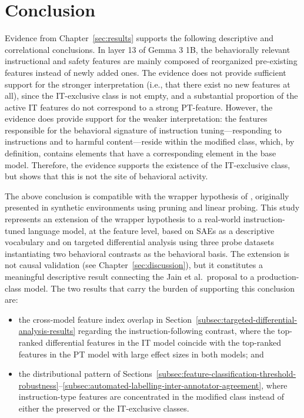 \pagestyle{fancy}

\section{Conclusion}
\label{sec:conclusions}

Evidence from Chapter~\ref{sec:results} supports the following descriptive and correlational conclusions. In layer 13 of Gemma 3 1B, the behaviorally relevant instructional and safety features are mainly composed of reorganized pre-existing features instead of newly added ones. The evidence does not provide sufficient support for the stronger interpretation (i.e., that there exist no new features at all), since the IT-exclusive class is not empty, and a substantial proportion of the active IT features do not correspond to a strong PT-feature. However, the evidence does provide support for the weaker interpretation: the features responsible for the behavioral signature of instruction tuning---responding to instructions and to harmful content---reside within the modified class, which, by definition, contains elements that have a corresponding element in the base model. Therefore, the evidence supports the existence of the IT-exclusive class, but shows that this is not the site of behavioral activity.

The above conclusion is compatible with the wrapper hypothesis of \textcite{jain_mechanistically_2024}, originally presented in synthetic environments using pruning and linear probing. This study represents an extension of the wrapper hypothesis to a real-world instruction-tuned language model, at the feature level, based on SAEs as a descriptive vocabulary and on targeted differential analysis using three probe datasets instantiating two behavioral contrasts as the behavioral basis. The extension is not causal validation (see Chapter~\ref{sec:discussion}), but it constitutes a meaningful descriptive result connecting the Jain et al.\ proposal to a production-class model. The two results that carry the burden of supporting this conclusion are:
\begin{itemize}
    \item the cross-model feature index overlap in Section~\ref{subsec:targeted-differential-analysis-results} regarding the instruction-following contrast, where the top-ranked differential features in the IT model coincide with the top-ranked features in the PT model with large effect sizes in both models; and
    \item the distributional pattern of Sections~\ref{subsec:feature-classification-threshold-robustness}--\ref{subsec:automated-labelling-inter-annotator-agreement}, where instruction-type features are concentrated in the modified class instead of either the preserved or the IT-exclusive classes.
\end{itemize}

